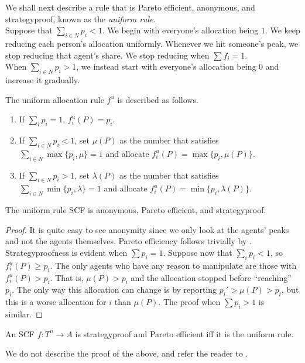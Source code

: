 		We shall next describe a rule that is Pareto efficient, anonymous, and strategyproof, known as the \emph{uniform rule}.\\
		Suppose that $\sum_{i \in N} p_i < 1$. We begin with everyone's allocation being $1$. We keep reducing each person's allocation uniformly. Whenever we hit someone's peak, we stop reducing that agent's share. We stop reducing when $\sum f_i = 1$.\\
		When $\sum_{i \in N} p_i > 1$, we instead start with everyone's allocation being $0$ and increase it gradually.

		\begin{fdef}
			The uniform allocation rule $f^u$ is described as follows.
			\begin{enumerate}
				\item If $\sum_i p_i = 1$, $f_i^u(P) = p_i$.
				\item If $\sum_{i \in N} p_i < 1$, set $\mu(P)$ as the number that satisfies $\sum_{i \in N} \max\{p_i,\mu\} = 1$ and allocate $f_i^u(P) = \max\{p_i,\mu(P)\}$.
				\item If $\sum_{i \in N} p_i > 1$, set $\lambda(P)$ as the number that satisfies $\sum_{i \in N} \min\{p_i,\lambda\} = 1$ and allocate $f_i^u(P) = \min\{p_i,\lambda(P)\}$.
			\end{enumerate}
		\end{fdef}

		\begin{flem}
			The uniform rule SCF is anonymous, Pareto efficient, and strategyproof.
		\end{flem}
		\begin{proof}
			It is quite easy to see anonymity since we only look at the agents' peaks and not the agents themselves.
			Pareto efficiency follows trivially by .\\
			Strategyproofness is evident when $\sum p_i = 1$.
			Suppose now that $\sum_i p_i < 1$, so $f_i^u(P) \ge p_i$. The only agents who have any reason to manipulate are those with $f_i^u(P) > p_i$. That is, $\mu(P) > p_i$ and the allocation stopped before ``reaching'' $p_i$. The only way this allocation can change is by reporting $p_i' > \mu(P) > p_i$, but this is a worse allocation for $i$ than $\mu(P)$. The proof when $\sum p_i > 1$ is similar.
		\end{proof}

		\begin{ftheo}[Sprumont]
			An SCF $f : T^n \to A$ is strategyproof and Pareto efficient iff it is the uniform rule.
		\end{ftheo}
		We do not describe the proof of the above, and refer the reader to \cite{sprumont-uniform-rule}.

